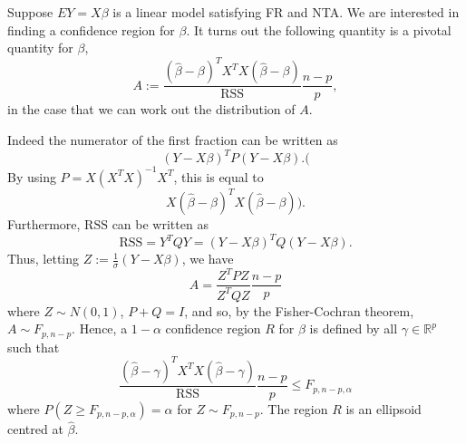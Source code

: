 \documentclass[
]{article}
\theoremstyle{definition}
\theoremstyle{definition}
\begin{document}
Suppose \(EY = X \beta\) is a linear model satisfying FR and NTA. We are
interested in finding a confidence region for \(\beta\). It turns out
the following quantity is a pivotal quantity for \(\beta\),
\[A := \frac{(\hat \beta - \beta)^T X^T X (\hat \beta - \beta)}{\text{RSS}} 
  \frac{n - p}{p},\] in the case that we can work out the distribution
of \(A\).

Indeed the numerator of the first fraction can be written as
\[(Y - X\beta)^T P(Y - X\beta).(\] By using \(P = X(X^T X)^{-1} X^T\),
this is equal to \[X(\hat \beta - \beta)^T X(\hat \beta - \beta)).\]
Furthermore, \(\text{RSS}\) can be written as
\[\text{RSS} = Y^T Q Y = (Y - X\beta)^T Q(Y - X \beta).\] Thus, letting
\(Z := \frac{1}{\sigma}(Y - X \beta)\), we have
\[A = \frac{Z^T P Z}{Z^T Q Z} \frac{n - p}{p}\] where
\(Z \sim N(0, 1)\), \(P + Q = I\), and so, by the Fisher-Cochran
theorem, \(A \sim F_{p, n - p}\). Hence, a \(1 - \alpha\) confidence
region \(R\) for \(\beta\) is defined by all \(\gamma \in \mathbb{R}^p\)
such that
\[\frac{(\hat \beta - \gamma)^T X^T X (\hat \beta - \gamma)}{\text{RSS}} \frac{n - p}{p} \le F_{p, n- p, \alpha}\]
where \(P(Z \ge F_{p, n - p, \alpha}) = \alpha\) for
\(Z \sim F_{p, n - p}\). The region \(R\) is an ellipsoid centred at
\(\hat \beta\).
\end{document}
